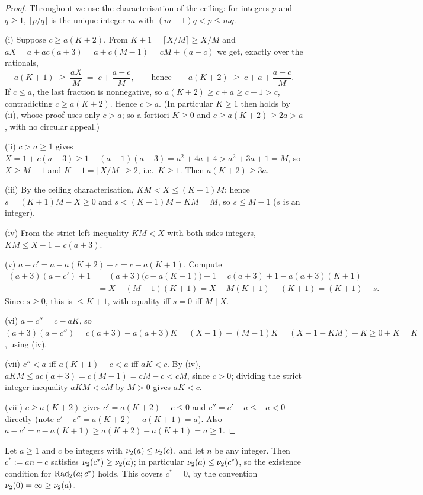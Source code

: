 \begin{proof}
Throughout we use the characterisation of the ceiling: for integers $p$
and $q \ge 1$, $\lceil p/q \rceil$ is the unique integer $m$ with
$(m-1)q < p \le mq$.

(i) Suppose $c \ge a(K+2)$. From
$K + 1 = \lceil X/M \rceil \ge X/M$ and
$aX = a + ac(a+3) = a + c(M-1) = cM + (a - c)$ we get, exactly over the
rationals,
\[
a(K+1) \;\ge\; \frac{aX}{M} \;=\; c + \frac{a-c}{M},
\qquad\text{hence}\qquad
a(K+2) \;\ge\; c + a + \frac{a-c}{M} .
\]
If $c \le a$, the last fraction is nonnegative, so
$a(K+2) \ge c + a \ge c + 1 > c$, contradicting $c \ge a(K+2)$. Hence
$c > a$. (In particular $K \ge 1$ then holds by (ii), whose proof uses only
$c > a$; so a fortiori $K \ge 0$ and $c \ge a(K+2) \ge 2a > a$, with no
circular appeal.)

(ii) $c > a \ge 1$ gives
$X = 1 + c(a+3) \ge 1 + (a+1)(a+3) = a^2 + 4a + 4 > a^2 + 3a + 1 = M$, so
$X \ge M + 1$ and $K + 1 = \lceil X/M \rceil \ge 2$, i.e.\ $K \ge 1$. Then
$a(K+2) \ge 3a$.

(iii) By the ceiling characterisation, $KM < X \le (K+1)M$; hence
$s = (K+1)M - X \ge 0$ and $s < (K+1)M - KM = M$, so $s \le M - 1$
($s$ is an integer).

(iv) From the strict left inequality $KM < X$ with both sides integers,
$KM \le X - 1 = c(a+3)$.

(v) $a - c' = a - a(K+2) + c = c - a(K+1)$. Compute
\begin{align*}
(a+3)(a - c') + 1 &= (a+3)\bigl(c - a(K+1)\bigr) + 1
= c(a+3) + 1 - a(a+3)(K+1) \\
&= X - (M-1)(K+1)
= X - M(K+1) + (K+1) = (K+1) - s .
\end{align*}
Since $s \ge 0$, this is $\le K + 1$, with equality iff $s = 0$ iff
$M \mid X$.

(vi) $a - c'' = c - aK$, so
$(a+3)(a - c'') = c(a+3) - a(a+3)K = (X-1) - (M-1)K = (X - 1 - KM) + K
\ge 0 + K = K$, using (iv).

(vii) $c'' < a$ iff $a(K+1) - c < a$ iff $aK < c$. By (iv),
$aKM \le ac(a+3) = c(M-1) = cM - c < cM$, since $c > 0$; dividing the
strict integer inequality $aKM < cM$ by $M > 0$ gives $aK < c$.

(viii) $c \ge a(K+2)$ gives $c' = a(K+2) - c \le 0$ and
$c'' = c' - a \le -a < 0$ directly (note
$c' - c'' = a(K+2) - a(K+1) = a$). Also
$a - c' = c - a(K+1) \ge a(K+2) - a(K+1) = a \ge 1$.
\end{proof}

\begin{lemma}\label{lem:conj-2adic}
Let $a \ge 1$ and $c$ be integers with $\nu_2(a) \le \nu_2(c)$, and let $n$
be any integer. Then $c^* := an - c$ satisfies
$\nu_2(c^*) \ge \nu_2(a)$; in particular $\nu_2(a) \le \nu_2(c^*)$, so the
existence condition for $\mathrm{Rad}_2(a;c^*)$ holds. This covers $c^* = 0$, by the
convention $\nu_2(0) = \infty \ge \nu_2(a)$.
\end{lemma}

